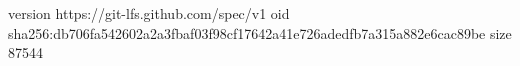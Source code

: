 version https://git-lfs.github.com/spec/v1
oid sha256:db706fa542602a2a3fbaf03f98cf17642a41e726adedfb7a315a882e6cac89be
size 87544
